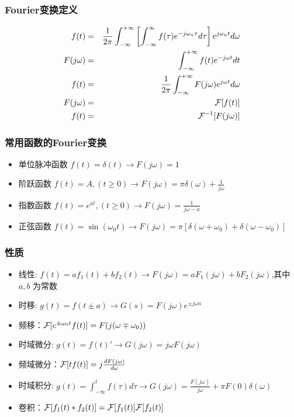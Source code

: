 \documentclass{beamer}
\begin{document}
\begin{frame}
\frametitle{Fourier变换定义}
\label{sec-6-4}

\begin{eqnarray*}
f(t)& = &\frac{1}{2\pi}\int_{-\infty}^{+\infty}\left[ \int_{-\infty }^{\infty}f(\tau)e^{-j\omega_n\tau}d\tau\right]e^{j\omega_n t}d\omega \\
F(j\omega)&=& \int_{-\infty}^{ + \infty}f(t)e^{-j\omega t}dt \\
f(t)  & =& \frac{1}{2\pi} \int_{-\infty}^{+\infty}F(j\omega)e^{j\omega t}d\omega \\
F(j\omega) &=& {\cal F}[f(t)] \\
f(t) &=& {\cal F}^{-1}[F(j\omega)] 
\end{eqnarray*}
\end{frame}
\begin{frame}
\frametitle{常用函数的Fourier变换}
\label{sec-6-5}

\begin{itemize}
\item 单位脉冲函数 $f(t)=\delta(t) \rightarrow   F(j\omega)=1$
\item 阶跃函数 $f(t)=A,(t\geq 0) \rightarrow   F(j\omega)=\pi\delta(\omega)+\frac{1}{j\omega}$
\item 指数函数 $f(t)=e^{at},(t\geq 0) \rightarrow  F(j\omega)=\frac{1}{j\omega-a}$
\item 正弦函数 $f(t)=\sin(\omega_0 t)\rightarrow F(j\omega)=\pi[\delta(\omega+\omega_0)+\delta(\omega-\omega_0)]$
\end{itemize}
\end{frame}
\begin{frame}
\frametitle{性质}
\label{sec-6-6}

\begin{itemize}
\item 线性: $f(t)=af_1(t)+bf_2(t)\rightarrow  F(j\omega)=aF_1(j\omega)+bF_2(j\omega)$,其中 $a,b$ 为常数
\item 时移: $g(t)=f(t\pm a) \rightarrow  G(s)=F(j\omega)e^{\pm j\omega a}$
\item 频移：${\cal F}[e^{\pm\omega_0 t}f(t)]=F(j(\omega\mp\omega_0))$
\item 时域微分: $g(t)=f(t)'\rightarrow  G(j\omega)=j\omega F(j\omega)$
\item 频域微分：${\cal F}[tf(t)]=j\frac{dF(j\omega)}{d\omega}$
\item 时域积分: $g(t)=\int_{-\infty}^{t} f(\tau) d\tau \rightarrow  G(j\omega)=\frac{F(j\omega)}{j\omega}+\pi F(0)\delta(\omega)$
\item 卷积：${\cal F}[f_1(t)*f_2(t)]={\cal F}[f_1(t)]{\cal F}[f_2(t)]$
\end{itemize}
\end{frame}
\end{document}
